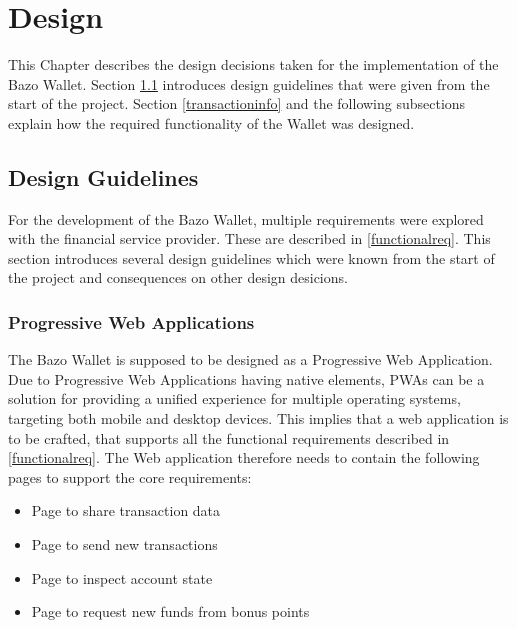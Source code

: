 \chapter{Design}\label{design}
This Chapter describes the design decisions taken for the implementation of the Bazo Wallet. Section \ref{designguide} introduces design guidelines that were given from the start of the project. Section \ref{transactioninfo} and the following subsections explain how the required functionality of the Wallet was designed.
\section{Design Guidelines}\label{designguide}
For the development of the Bazo Wallet, multiple requirements were explored with the financial service provider. These are described in \ref{functionalreq}. This section introduces several design guidelines which were known from the start of the project and consequences on other design desicions.
\subsection{Progressive Web Applications}
The Bazo Wallet is supposed to be designed as a Progressive Web Application. Due to Progressive Web Applications having native elements, PWAs can be a solution for providing a unified experience for multiple operating systems, targeting both mobile and desktop devices. This implies that a web application is to be crafted, that supports all the functional requirements described in \ref{functionalreq}. The Web application therefore needs to contain the following pages to support the core requirements:
\begin{itemize}
\item Page to share transaction data
\item Page to send new transactions
\item Page to inspect account state
\item Page to request new funds from bonus points
\end{itemize}

